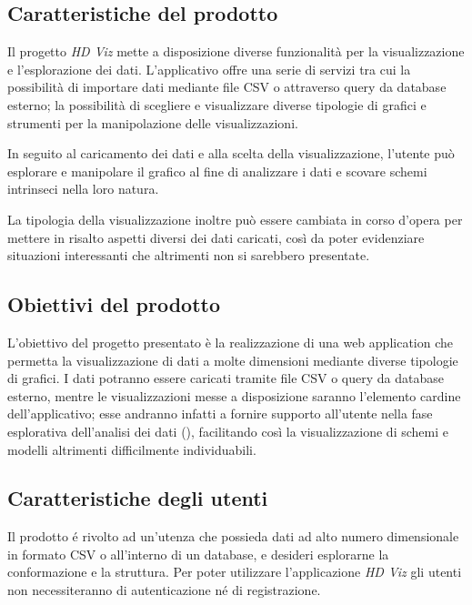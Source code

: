 \documentclass[../analisi-dei-requisiti.tex]{subfiles}
\begin{document}
\subsection{Caratteristiche del prodotto}
\label{sub:caratteristiche_del_prodotto}
Il progetto \emph{HD Viz} mette a disposizione diverse funzionalità per la visualizzazione e l'esplorazione dei 
dati. L'applicativo offre una serie di servizi tra cui la possibilità di importare dati mediante file CSV o attraverso query da database esterno; la possibilità di scegliere e visualizzare diverse tipologie di grafici e strumenti per la manipolazione delle visualizzazioni.

In seguito al caricamento dei dati e alla scelta della visualizzazione, l'utente può esplorare e manipolare il grafico 
al fine di analizzare i dati e scovare schemi intrinseci nella loro natura.

La tipologia della visualizzazione inoltre può essere cambiata in corso d'opera per mettere in risalto aspetti diversi 
dei dati caricati, così da poter evidenziare situazioni interessanti che altrimenti non si sarebbero presentate.

\subsection{Obiettivi del prodotto}
\label{sub:obiettivo_del_prodotto}
L'obiettivo del progetto presentato è la realizzazione di una web application che permetta la visualizzazione di dati a 
molte dimensioni mediante diverse tipologie di grafici.
I dati potranno essere caricati tramite file CSV o query da database esterno, mentre le visualizzazioni messe a 
disposizione saranno l'elemento cardine dell'applicativo; esse andranno infatti a fornire supporto all'utente 
nella fase esplorativa dell'analisi dei dati (), facilitando così la visualizzazione di schemi e modelli 
altrimenti difficilmente individuabili.

\subsection{Caratteristiche degli utenti}
\label{sub:caratteristiche_degli_utenti}

Il prodotto é rivolto ad un'utenza che possieda dati ad alto numero dimensionale in formato CSV o all'interno di un 
database, e desideri esplorarne la conformazione e la struttura. Per poter utilizzare l'applicazione \emph{HD Viz} gli 
utenti non necessiteranno di autenticazione né di registrazione.
\end{document}
